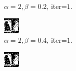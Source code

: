 \documentclass{article}
\begin{document}
\begin{figure}[t]
\begin{subfigure}[t]{0.27\textwidth}
  \vspace{-0.6cm}
  \caption{$\alpha=2, \beta=0.2$, iter=$1$.}
\end{subfigure}
\begin{subfigure}[t]{0.27\textwidth}
  \centering
  \includegraphics[width=\textwidth]{iii_alpha_2_beta_0.4_iterations_2.bmp}
  \vspace{-0.6cm}
  \caption{$\alpha=2, \beta=0.4$, iter=$1$.}
\end{subfigure}
\begin{subfigure}[t]{0.27\textwidth}
  \centering
  \includegraphics[width=\textwidth]{iii_alpha_2_beta_0.05_iterations_3.bmp}

\end{subfigure}
\end{figure}
\end{document}
